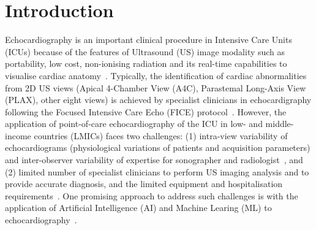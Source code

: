 \documentclass[mlabstract,twocolumn]{jmlr}
\begin{document}
\section{Introduction}
\label{sec:intro}
Echocardiography is an important clinical procedure in Intensive Care Units (ICUs) because of the features of Ultrasound (US) image modality such as portability, low cost, non-ionising radiation and its real-time capabilities to visualise cardiac anatomy~\citep{Vieillard-Baron2008, cambell2018}. %
Typically, the identification of cardiac abnormalities from 2D US views (Apical 4-Chamber View (A4C), Parastemal Long-Axis View (PLAX), other eight views) is achieved by specialist clinicians in echocardigraphy following the Focused Intensive Care Echo (FICE) protocol~\citep{2017_hall_JIntensiveCareSociety}. %
However, the application of point-of-care echocardiography of the ICU  in low- and middle-income countries (LMICs) faces two challenges:
(1) intra-view variability of echocardiograms (physiological variations of patients and acquisition parameters) and inter-observer variability of expertise for sonographer and radiologist~\citep{Feigenbaum1996, khamis2017, field2011}, and
(2) limited number of specialist clinicians to perform US imaging analysis and to provide accurate diagnosis, and the limited equipment and hospitalisation requirements~\citep{2016_becker_in_TropicalMedicineInternationalHealth, hao2021-wellcome, 2021-huyNhat-vanHao-in-FAIR-MICCAI}.
One promising approach to address such challenges is with the application of Artificial Intelligence (AI) and Machine Learing (ML) to echocardiography~\citep{2022asch_AmericanSocietyofEchocardiography}.
\end{document}
